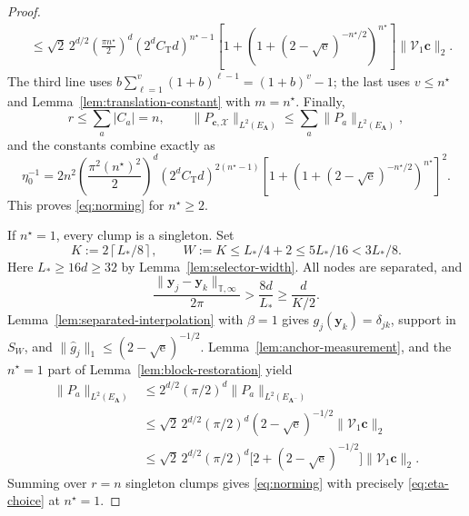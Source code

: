 \documentclass[11pt]{article}
\newcommand{\V}{\mathcal V}
\newcommand{\X}{\mathcal X}
\newcommand{\T}{\mathbb T}
\begin{document}
\begin{proof}
\begin{align*}
&\le\sqrt2\,2^{d/2}\left(\frac{\pi n^\star}{2}\right)^d(2^dC_{\mathrm T}d)^{n^\star-1}\left[1+\left(1+(2-\sqrt{\mathrm e})^{-n^\star/2}\right)^{n^\star}\right]\|\V_1\bm c\|_2.
\end{align*}
The third line uses $b\sum_{\ell=1}^v(1+b)^{\ell-1}=(1+b)^v-1$; the last uses $v\le n^\star$ and Lemma~\ref{lem:translation-constant} with $m=n^\star$. Finally,
\[
r\le\sum_a|C_a|=n,\qquad \|P_{\bm c,\X}\|_{L^2(E_{\bm\Lambda})}\le\sum_a\|P_a\|_{L^2(E_{\bm\Lambda})},
\]
and the constants combine exactly as
\begin{equation}\label{eq:eta-inverse}
\eta_0^{-1}=2n^2\left(\frac{\pi^2(n^\star)^2}{2}\right)^d(2^dC_{\mathrm T}d)^{2(n^\star-1)}\left[1+\left(1+(2-\sqrt{\mathrm e})^{-n^\star/2}\right)^{n^\star}\right]^2.
\end{equation}
This proves \eqref{eq:norming} for $n^\star\ge2$.

If $n^\star=1$, every clump is a singleton. Set
\[
K:=2\left\lceil L_*/8\right\rceil,\qquad W:=K\le L_*/4+2\le5L_*/16<3L_*/8.
\]
Here $L_*\ge16d\ge32$ by Lemma~\ref{lem:selector-width}. All nodes are separated, and
\[
\frac{\|\bm y_j-\bm y_k\|_{\T,\infty}}{2\pi}>\frac{8d}{L_*}\ge\frac{d}{K/2}.
\]
Lemma~\ref{lem:separated-interpolation} with $\beta=1$ gives $g_j(\bm y_k)=\delta_{jk}$, support in $S_W$, and $\|\widehat g_j\|_1\le(2-\sqrt{\mathrm e})^{-1/2}$. Lemma~\ref{lem:anchor-measurement}, and the $n^\star=1$ part of Lemma~\ref{lem:block-restoration} yield
\begin{align*}
\|P_a\|_{L^2(E_{\bm\Lambda})}&\le2^{d/2}(\pi/2)^d\|P_a\|_{L^2(E_{\bm\Lambda^-})}\\
&\le\sqrt2\,2^{d/2}(\pi/2)^d(2-\sqrt{\mathrm e})^{-1/2}\|\V_1\bm c\|_2\\
&\le\sqrt2\,2^{d/2}(\pi/2)^d\bigl[2+(2-\sqrt{\mathrm e})^{-1/2}\bigr]\|\V_1\bm c\|_2.
\end{align*}
Summing over $r=n$ singleton clumps gives \eqref{eq:norming} with precisely \eqref{eq:eta-choice} at $n^\star=1$.
\end{proof}
\end{document}
